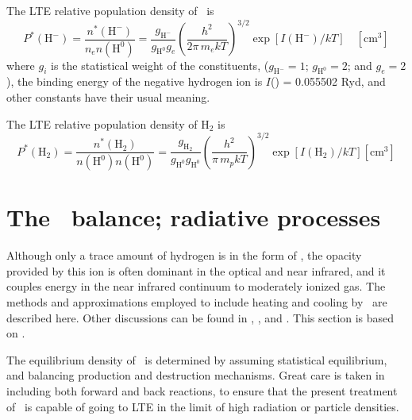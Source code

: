 The LTE relative population density of \hminus\ is
\begin{equation}
{P^*}\left( {{{\mathrm{H}}^ - }} \right) = \frac{{{n^*}\left( {{{\mathrm{H}}^
- }} \right)}}{{{n_e}n\left( {{{\mathrm{H}}^{\mathrm{0}}}} \right)}} =
\frac{{{g_{{{\mathrm{H}}^ - }}}}}{{{g_{{{\mathrm{H}}^{\mathrm{0}}}}}{g_e}}}{\left(
{\frac{{{h^2}}}{{2\pi \,{m_e}kT}}} \right)^{3/2}}\exp \left[ {I({{\mathrm{H}}^
- })/kT} \right]\quad  [\mathrm{cm}^3]
\end{equation}
where $g_i$ is the statistical weight of the constituents,
(${g_{{{\mathrm{H}}^{\mathrm{ - }}}}} = 1$; ${g_{{{\mathrm{H}}^{\mathrm{0}}}}} = 2$; and
${g_e} = 2$),  the binding energy of the negative hydrogen ion is $I$(\hminus) = 0.055502
Ryd, and other constants have their usual meaning.

The LTE relative population density of H$_2$ is
\begin{equation}
{P^*}\left( {{{\mathrm{H}}_2}} \right) = \frac{{{n^*}\left( {{{\mathrm{H}}_2}}
\right)}}{{n\left( {{{\mathrm{H}}^{\mathrm{0}}}} \right)n\left( {{{\mathrm{H}}^{\mathrm{0}}}}
\right)}} =
\frac{{{g_{{{\mathrm{H}}_2}}}}}{{{g_{{{\mathrm{H}}^{\mathrm{0}}}}}{g_{{{\mathrm{H}}^{\mathrm{0}}}}}}}{\left(
{\frac{{{h^2}}}{{\pi \,{m_p}kT}}} \right)^{3/2}}\exp \left[
{I({{\mathrm{H}}_2})/kT} \right] [\mathrm{cm}^3]
\end{equation}

\section{The \hminus\ balance; radiative processes}

Although only a trace amount of hydrogen is in the form of \hminus, the opacity
provided by this ion is often dominant in the optical and near infrared,
and it couples energy in the near infrared continuum to moderately ionized
gas.  The methods and approximations employed to include heating and cooling
by \hminus\ are described here. Other discussions can be found in
\citet{Lambert1968}, \citet{Vernazza1981}, and \citet{Lites1984}.
This section is based on \citet{Ferland1989}.

The equilibrium density of \hminus\  is determined by assuming statistical
equilibrium, and balancing production and destruction mechanisms.  Great
care is taken in including both forward and back reactions, to ensure that
the present treatment of \hminus\ is capable of going to LTE in the limit of high
radiation or particle densities.

